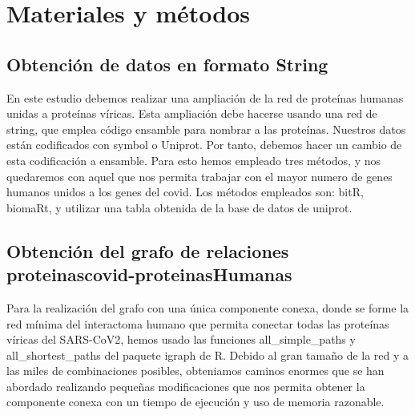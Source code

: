 \section{Materiales y métodos}


\subsection{Obtención de datos en formato String}
En este estudio debemos realizar una ampliación de la red de proteínas humanas unidas a proteínas víricas.
Esta ampliación debe hacerse usando una red de string, que emplea código ensamble para nombrar a las proteínas.
Nuestros datos están codificados con symbol o Uniprot. Por tanto, debemos hacer un cambio de esta codificación a ensamble.
Para esto hemos empleado tres métodos, y nos quedaremos con aquel que nos permita trabajar con el mayor numero de genes humanos unidos a los genes del covid.
Los métodos empleados son: bitR, biomaRt, y utilizar una tabla obtenida de la base de datos de uniprot. 

\subsection{Obtención del grafo de relaciones proteinascovid-proteinasHumanas}
Para la realización del grafo con una única componente conexa, donde se forme la red mínima del interactoma humano
que permita conectar todas las proteínas víricas del SARS-CoV2, hemos usado las funciones all_simple_paths y all_shortest_paths 
del paquete igraph de R. Debido al gran tamaño de la red y a las miles de combinaciones posibles, obteniamos caminos enormes que
se han abordado realizando pequeñas modificaciones que nos permita obtener la componente conexa con un tiempo de ejecución y 
uso de memoria razonable. 




